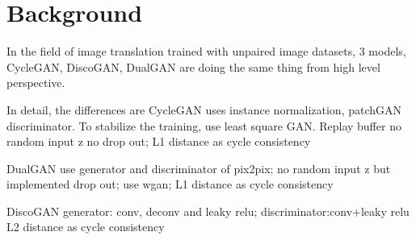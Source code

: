\chapter{Background}\label{Ch:Background}
In the field of image translation trained with unpaired image datasets, 3 models, CycleGAN, DiscoGAN, DualGAN are doing the same thing from high level perspective.

In detail, the differences are
CycleGAN uses instance normalization, patchGAN discriminator. To stabilize the training, use least square GAN. Replay buffer
              no random input z no drop out; L1 distance as cycle consistency

DualGAN use generator and discriminator of pix2pix; no random input z but implemented drop out; use wgan;
             L1 distance as cycle consistency

DiscoGAN generator: conv, deconv and leaky relu; discriminator:conv+leaky relu  L2 distance as cycle consistency







